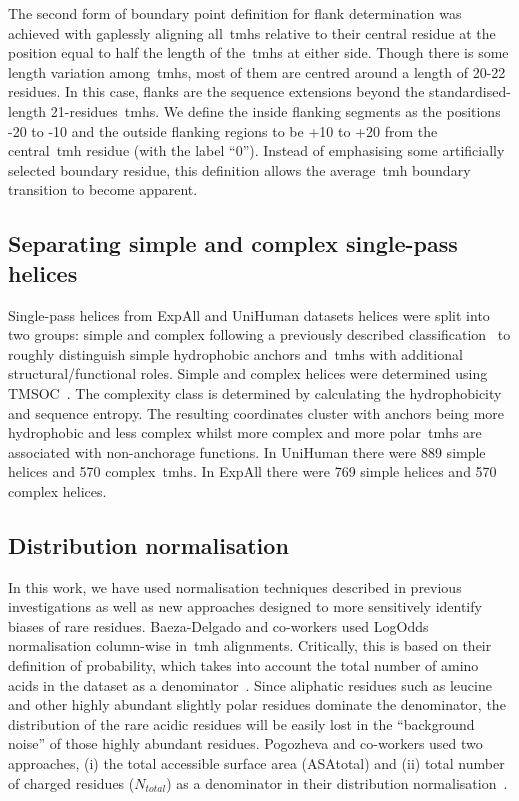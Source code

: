 The second form of boundary point definition for flank determination was achieved with gaplessly aligning all~\gls{tmh}s relative to their central residue at the position equal to half the length of the~\gls{tmh}s at either side.
Though there is some length variation among~\gls{tmh}s, most of them are centred around a length of 20-22 residues.
In this case, flanks are the sequence extensions beyond the standardised-length 21-residues~\gls{tmh}s.
We define the inside flanking segments as the positions -20 to -10 and the outside flanking regions to be +10 to +20 from the central~\gls{tmh} residue (with the label ``0'').
Instead of emphasising some artificially selected boundary residue, this definition allows the average~\gls{tmh} boundary transition to become apparent.

\subsection{Separating simple and complex single-pass helices}

Single-pass helices from ExpAll and UniHuman datasets helices were split into two groups: simple and complex following a previously described classification~\cite{Wong2011,Wong2012} to roughly distinguish simple hydrophobic anchors and~\gls{tmh}s with additional structural/functional roles.
Simple and complex helices were determined using TMSOC~\cite{Wong2012}.
The complexity class is determined by calculating the hydrophobicity and sequence entropy.
The resulting coordinates cluster with anchors being more hydrophobic and less complex whilst more complex and more polar~\gls{tmh}s are associated with non-anchorage functions.
In UniHuman there were 889 simple helices and 570 complex~\gls{tmh}s.
In ExpAll there were 769 simple helices and 570 complex helices.

\subsection{Distribution normalisation}

In this work, we have used normalisation techniques described in previous investigations as well as new approaches designed to more sensitively identify biases of rare residues.
Baeza-Delgado and co-workers used LogOdds normalisation column-wise in~\gls{tmh} alignments.
Critically, this is based on their definition of probability, which takes into account the total number of amino acids in the dataset as a denominator~\cite{Baeza-Delgado2013}.
Since aliphatic residues such as leucine and other highly abundant slightly polar residues dominate the denominator, the distribution of the rare acidic residues will be easily lost in the ``background noise'' of those highly abundant residues.
Pogozheva and co-workers used two approaches, (i) the total accessible surface area (ASAtotal) and (ii) total number of charged residues (${N}_{total}$) as a denominator in their distribution normalisation~\cite{Pogozheva2013}.

